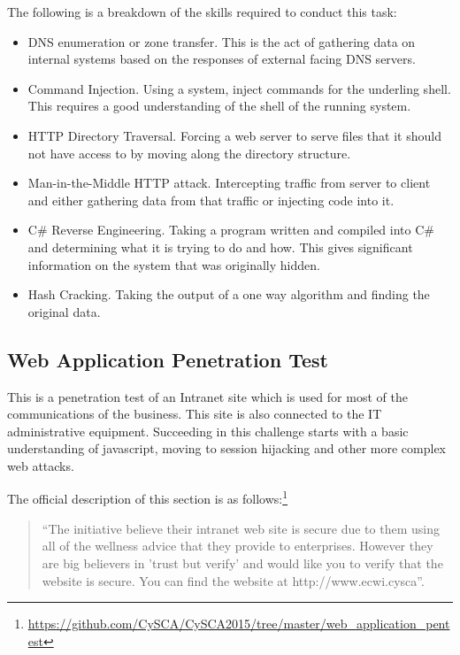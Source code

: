 \documentclass[a4paper,11pt]{report}
\begin{document}
			The following is a breakdown of the skills required to conduct this task:
			\begin{itemize}
				\item DNS enumeration or zone transfer.
					This is the act of gathering data on internal systems based on the responses of external facing DNS servers. 
				\item Command Injection.
					Using a system, inject commands for the underling shell. 
					This requires a good understanding of the shell of the running system. 
				\item HTTP Directory Traversal. 
					Forcing a web server to serve files that it should not have access to by moving along the directory structure.
				\item Man-in-the-Middle HTTP attack.
					Intercepting traffic from server to client and either gathering data from that traffic or injecting code into it. 
				\item C\# Reverse Engineering.
					Taking a program written and compiled into C\# and determining what it is trying to do and how. 
					This gives significant information on the system that was originally hidden. 
				\item Hash Cracking. 
					Taking the output of a one way algorithm and finding the original data. 
			\end{itemize}
		\subsection{Web Application Penetration Test}
			This is a penetration test of an Intranet site which is used for most of the communications of the business. 
			This site is also connected to the IT administrative equipment. 
			Succeeding in this challenge starts with a basic understanding of javascript, moving to session hijacking and other more complex web attacks. 
			
			The official description of this section is as follows:\footnote{\url{https://github.com/CySCA/CySCA2015/tree/master/web\_application\_pentest}}
			\begin{quote}
				``The initiative believe their intranet web site is secure due to them using all of the wellness advice that they provide to enterprises. However they are big believers in 'trust but verify' and would like you to verify that the website is secure. You can find the website at http://www.ecwi.cysca''. 
			\end{quote}
\end{document}
